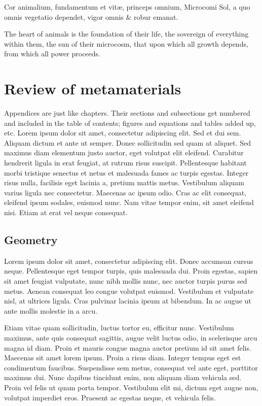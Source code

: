 \begin{savequote}[8cm]
\textlatin{Cor animalium, fundamentum e\longs t vitæ, princeps omnium, Microco\longs mi Sol, a quo omnis vegetatio dependet, vigor omnis \& robur emanat.}

The heart of animals is the foundation of their life, the sovereign of everything within them, the sun of their microcosm, that upon which all growth depends, from which all power proceeds.
\end{savequote}

\chapter{\label{app:1-metamat}Review of metamaterials}

\minitoc

Appendices are just like chapters.  Their sections and subsections get numbered and included in the table of contents; figures and equations and tables added up, etc.  Lorem ipsum dolor sit amet, consectetur adipiscing elit. Sed et dui sem. Aliquam dictum et ante ut semper. Donec sollicitudin sed quam at aliquet. Sed maximus diam elementum justo auctor, eget volutpat elit eleifend. Curabitur hendrerit ligula in erat feugiat, at rutrum risus suscipit. Pellentesque habitant morbi tristique senectus et netus et malesuada fames ac turpis egestas. Integer risus nulla, facilisis eget lacinia a, pretium mattis metus. Vestibulum aliquam varius ligula nec consectetur. Maecenas ac ipsum odio. Cras ac elit consequat, eleifend ipsum sodales, euismod nunc. Nam vitae tempor enim, sit amet eleifend nisi. Etiam at erat vel neque consequat.

\section{Geometry}
\label{sec:geometry}

Lorem ipsum dolor sit amet, consectetur adipiscing elit. Donec accumsan cursus neque. Pellentesque eget tempor turpis, quis malesuada dui. Proin egestas, sapien sit amet feugiat vulputate, nunc nibh mollis nunc, nec auctor turpis purus sed metus. Aenean consequat leo congue volutpat euismod. Vestibulum et vulputate nisl, at ultrices ligula. Cras pulvinar lacinia ipsum at bibendum. In ac augue ut ante mollis molestie in a arcu.

Etiam vitae quam sollicitudin, luctus tortor eu, efficitur nunc. Vestibulum maximus, ante quis consequat sagittis, augue velit luctus odio, in scelerisque arcu magna id diam. Proin et mauris congue magna auctor pretium id sit amet felis. Maecenas sit amet lorem ipsum. Proin a risus diam. Integer tempus eget est condimentum faucibus. Suspendisse sem metus, consequat vel ante eget, porttitor maximus dui. Nunc dapibus tincidunt enim, non aliquam diam vehicula sed. Proin vel felis ut quam porta tempor. Vestibulum elit mi, dictum eget augue non, volutpat imperdiet eros. Praesent ac egestas neque, et vehicula felis.


